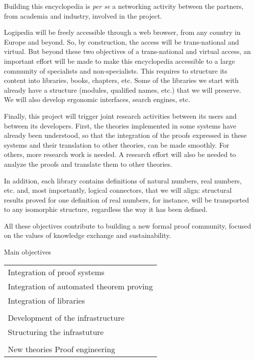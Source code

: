 Building this encyclopedia is {\em per se} a networking activity
between the partners, from academia and industry, involved in the
project.

Logipedia will be freely accessible through a web browser, from any
country in Europe and beyond. So, by construction, the access will be
trans-national and virtual. But beyond these two objectives of a
trans-national and virtual access, an important effort will be made to
make this encyclopedia accessible to a large community of specialists
and non-specialists. This requires to structure its content into
libraries, books, chapters, etc. Some of the libraries we start with
already have a structure (modules, qualified names, etc.) that we will
preserve. We will also develop ergonomic interfaces, search engines,
etc.

Finally, this project will trigger joint research activities between
its users and between its developers.  First, the theories implemented
in some systems have already been understood, so that the integration
of the proofs expressed in these systems and their translation to
other theories, can be made smoothly. For others, more research work
is needed. A research effort will also be needed to analyze the proofs and
translate them to other theories. 

In addition, each library contains definitions of natural numbers,
real numbers, etc. and, most importantly, logical connectors, that
we will align: structural results proved for one definition of real
numbers, for instance, will be transported to any isomorphic structure, 
regardless the way it has been defined.

All these objectives contribute to building a new formal proof
community, focused on the values of knowledge exchange and
sustainability.


\newpage

\begin{framed}
\begin{center}
Main objectives
\end{center}

\begin{tabular}{l}
  Integration of proof systems\\
  Integration of automated theorem proving\\
  Integration of libraries\\
  \\
  Development of the infrastructure\\
  Structuring the infrastuture\\
  \\
  New theories
  Proof engineering\\
\end{tabular}
\end{framed}


